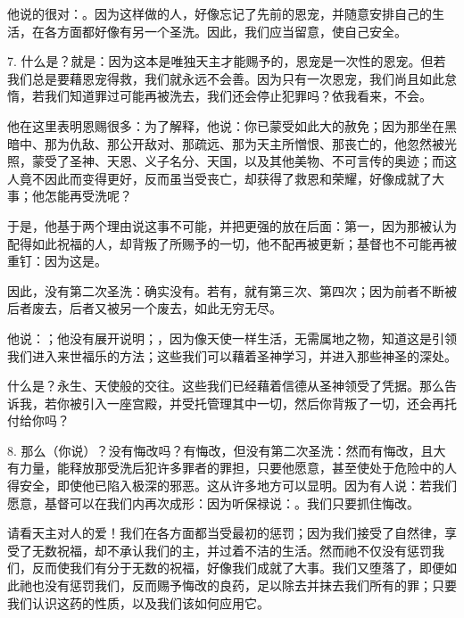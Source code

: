 他说的很对：。因为这样做的人，好像忘记了先前的恩宠，并随意安排自己的生活，在各方面都好像有另一个圣洗。因此，我们应当留意，使自己安全。\par

7. 什么是？就是：因为这本是唯独天主才能赐予的，恩宠是一次性的恩宠。但若我们总是要藉恩宠得救，我们就永远不会善。因为只有一次恩宠，我们尚且如此怠惰，若我们知道罪过可能再被洗去，我们还会停止犯罪吗？依我看来，不会。\par

他在这里表明恩赐很多：为了解释，他说：你已蒙受如此大的赦免；因为那坐在黑暗中、那为仇敌、那公开敌对、那疏远、那为天主所憎恨、那丧亡的，他忽然被光照，蒙受了圣神、天恩、义子名分、天国，以及其他美物、不可言传的奥迹；而这人竟不因此而变得更好，反而虽当受丧亡，却获得了救恩和荣耀，好像成就了大事；他怎能再受洗呢？\par

于是，他基于两个理由说这事不可能，并把更强的放在后面：第一，因为那被认为配得如此祝福的人，却背叛了所赐予的一切，他不配再被更新；基督也不可能再被重钉：因为这是。\par

因此，没有第二次圣洗：确实没有。若有，就有第三次、第四次；因为前者不断被后者废去，后者又被另一个废去，如此无穷无尽。\par

他说：；他没有展开说明；，因为像天使一样生活，无需属地之物，知道这是引领我们进入来世福乐的方法；这些我们可以藉着圣神学习，并进入那些神圣的深处。\par

什么是？永生、天使般的交往。这些我们已经藉着信德从圣神领受了凭据。那么告诉我，若你被引入一座宫殿，并受托管理其中一切，然后你背叛了一切，还会再托付给你吗？\par

8. 那么（你说）？没有悔改吗？有悔改，但没有第二次圣洗：然而有悔改，且大有力量，能释放那受洗后犯许多罪者的罪担，只要他愿意，甚至使处于危险中的人得安全，即使他已陷入极深的邪恶。这从许多地方可以显明。因为有人说：若我们愿意，基督可以在我们内再次成形：因为听保禄说：。我们只要抓住悔改。\par

请看天主对人的爱！我们在各方面都当受最初的惩罚；因为我们接受了自然律，享受了无数祝福，却不承认我们的主，并过着不洁的生活。然而祂不仅没有惩罚我们，反而使我们有分于无数的祝福，好像我们成就了大事。我们又堕落了，即便如此祂也没有惩罚我们，反而赐予悔改的良药，足以除去并抹去我们所有的罪；只要我们认识这药的性质，以及我们该如何应用它。\par

